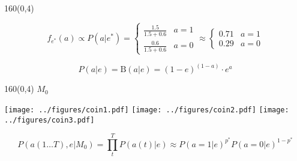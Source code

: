 \documentclass[shownotes,aspectratio=169]{beamer}
\newif\ifen
\newif\ifes
\newcommand{\en}[1]{\ifen#1\fi}
\newcommand{\es}[1]{\ifes#1\fi}
\begin{document}
\begin{frame}[plain]
\begin{textblock}{160}(0,4)
 \centering \LARGE
\en{Base model}
\end{textblock}
\vspace{1cm}

\begin{equation*}
f_{e^*}(a) \propto  P(a|e^*) = \begin{cases}
 \frac{1.5}{1.5+0.6} & a = 1 \\
 \frac{0.6}{1.5+0.6} & a = 0
  \end{cases}
  \approx
\begin{cases}
 0.71 & a= 1 \\
 0.29 & a= 0
\end{cases}
\end{equation*}

\pause

\vspace{0.3cm}

\begin{equation*}
P(a|e) = \text{B}(a|e) = (1-e)^{(1-a)} \cdot e^a 
\end{equation*}

\end{frame}

\begin{frame}[plain]
\begin{textblock}{160}(0,4)
 \centering \LARGE
\en{Base model} $M_0$
\end{textblock}
\vspace{1.3cm}


\centering
{}

\vspace{0.2cm}
\pause

\texttt{[image: ../figures/coin1.pdf]}
\texttt{[image: ../figures/coin2.pdf]}   
\texttt{[image: ../figures/coin3.pdf]}
    
\vspace{-0.7cm}
\pause    
    
    
\begin{equation*}
P(a(1\dots T), e | M_0) = \prod_t^T P(a(t)|e) \approx  P(a=1|e)^{p^*} P(a=0|e)^{1-p^*}
\end{equation*}

\end{frame}
\end{document}
